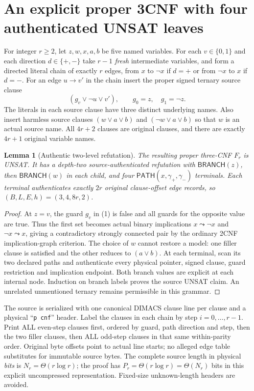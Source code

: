 \documentclass[11pt]{article}
\newtheorem{lemma}[theorem]{Lemma}
\begin{document}
\section{An explicit proper 3CNF with four authenticated UNSAT leaves}
For integer $r\ge2$, let $z,w,x,a,b$ be five named variables. For each $v\in\{0,1\}$ and each direction $d\in\{+,-\}$ take $r-1$ \emph{fresh} intermediate variables, and form a directed literal chain of exactly $r$ edges, from $x$ to $\neg x$ if $d=+$ or from $\neg x$ to $x$ if $d=-$. For an edge $u\to v'$ in the chain insert the proper signed ternary source clause
\[
 (g_v\vee\neg u\vee v'),\qquad g_0=z,\quad g_1=\neg z.\tag{1}
\]
The literals in each source clause have three distinct underlying names. Also insert harmless source clauses $(w\vee a\vee b)$ and $(\neg w\vee a\vee b)$ so that $w$ is an actual source name. All $4r+2$ clauses are original clauses, and there are exactly $4r+1$ original variable names.

\begin{lemma}[Authentic two-level refutation]\label{lem:ref}
The resulting proper three-CNF $F_r$ is UNSAT. It has a depth-two source-authenticated refutation with \(\mathsf{BRANCH}(z)\), then \(\mathsf{BRANCH}(w)\) in each child, and four \(\mathsf{PATH}(x,\gamma_+,\gamma_-)\) terminals. Each terminal authenticates exactly $2r$ original clause-offset edge records, so $(B,L,E,h)=(3,4,8r,2)$.
\end{lemma}
\begin{proof}
At $z=v$, the guard $g_v$ in (1) is false and all guards for the opposite value are true. Thus the first set becomes actual binary implications $x\leadsto\neg x$ and $\neg x\leadsto x$, giving a contradictory strongly connected pair by the ordinary 2CNF implication-graph criterion. The choice of $w$ cannot restore a model: one filler clause is satisfied and the other reduces to $(a\vee b)$. At each terminal, scan its two declared paths and authenticate every physical pointer, signed clause, guard restriction and implication endpoint. Both branch values are explicit at each internal node. Induction on branch labels proves the source UNSAT claim. An unrelated unmentioned ternary remains permissible in this grammar.\end{proof}

The source is serialized with one canonical DIMACS clause line per clause and a physical ``\texttt{p cnf}'' header. Label the clauses in each chain by step $i=0,\ldots,r-1$. Print ALL even-step clauses first, ordered by guard, path direction and step, then the two filler clauses, then ALL odd-step clauses in that same within-parity order. Original byte offsets point to actual line starts; no alleged edge table substitutes for immutable source bytes. The complete source length in physical \emph{bits} is $N_r=\Theta(r\log r)$; the proof has $P_r=\Theta(r\log r)=\Theta(N_r)$ bits in this explicit uncompressed representation. Fixed-size unknown-length headers are avoided.
\end{document}
